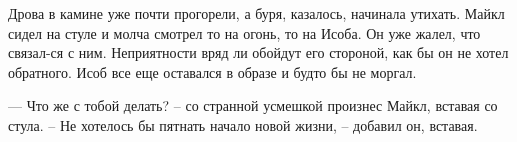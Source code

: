 Дрова в камине уже почти прогорели, а буря, казалось, начинала утихать. Майкл сидел на стуле и молча смотрел то на огонь, то на Исоба. Он уже жалел, что связал-ся с ним. Неприятности вряд ли обойдут его стороной, как бы он не хотел обратного. Исоб все еще оставался в образе и будто бы не моргал. 

— Что же с тобой делать? – со странной усмешкой произнес Майкл, вставая со стула. – Не хотелось бы пятнать начало новой жизни, – добавил он, вставая. 
\clearpage
{\begingroup
{}
\noindent
\endgroup}
\cleardoublepage
